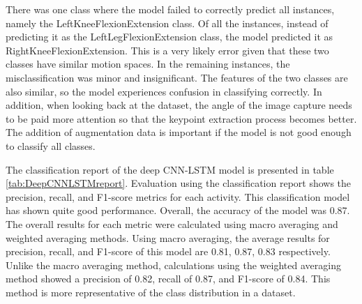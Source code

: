 There was one class where the model failed to correctly predict all instances, namely the LeftKneeFlexionExtension class. Of all the instances, instead of predicting it as the LeftLegFlexionExtension class, the model predicted it as RightKneeFlexionExtension. This is a very likely error given that these two classes have similar motion spaces. In the remaining instances, the misclassification was minor and insignificant. The features of the two classes are also similar, so the model experiences confusion in classifying correctly. In addition, when looking back at the dataset, the angle of the image capture needs to be paid more attention so that the keypoint extraction process becomes better. The addition of augmentation data is important if the model is not good enough to classify all classes.

The classification report of the deep CNN-LSTM model is presented in table \ref{tab:DeepCNNLSTMreport}. Evaluation using the classification report shows the precision, recall, and F1-score metrics for each activity. This classification model has shown quite good performance. Overall, the accuracy of the model was 0.87. The overall results for each metric were calculated using macro averaging and weighted averaging methods. Using macro averaging, the average results for precision, recall, and F1-score of this model are 0.81, 0.87, 0.83 respectively. Unlike the macro averaging method, calculations using the weighted averaging method showed a precision of 0.82, recall of 0.87, and F1-score of 0.84. This method is more representative of the class distribution in a dataset.


